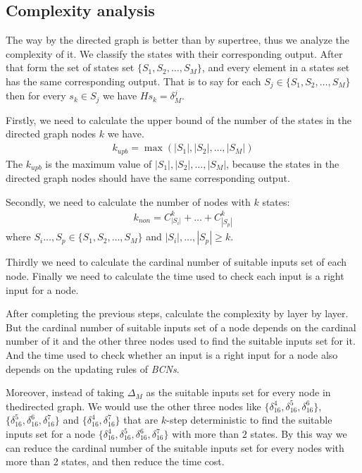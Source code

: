 \subsection{Complexity analysis}
The way by the directed graph is better than by supertree, thus we analyze the complexity of it. We classify the states with their corresponding output. After that form the set of states set $\{S_1, S_2,\ldots,S_M\}$,  and every element in a states set has the same corresponding output. That is to say for each $S_j\in\{S_1, S_2,\ldots,S_M\}$ then for every $s_k\in S_j$ we have $Hs_k=\delta_{M}^j$.

Firstly, we need to calculate the upper bound of the number of the states in the directed graph nodes $k$ we have.
\begin{equation}
\begin{split}
k_{upb}= \max(|S_1|,|S_2|,\ldots,|S_M|)
\end{split}
\end{equation}
The $ k_{upb}$ is the maximum value of $|S_1|,|S_2|,\ldots,|S_M|$, because the states in the directed graph nodes should have the same corresponding output.

Secondly, we need to calculate the number of nodes with $k$ states:
\begin{equation}
\begin{split}
k_{non}= C_{|S_i|}^k+\ldots +C_{|S_p|}^k
\end{split}
\end{equation}
where $S_i\ldots,S_p\in\{S_1, S_2,\ldots,S_M\}$ and $|S_i|,\ldots,|S_p|\ge k$.

Thirdly we need to calculate the cardinal number of suitable inputs set of each node. Finally we need to calculate the time used to check each input is a right input for a node.

After completing the previous steps, calculate the complexity by layer by layer. But the cardinal number of suitable inputs set of a node depends on the cardinal number of it and the other three nodes used to find the suitable inputs set for it. And the time used to check whether an input is a right input for a node also depends on the updating rules of {\em BCNs}.

Moreover, instead of taking $\Delta_M$ as the suitable inputs set for every node in thedirected graph. We would use the other three nodes like $\{\delta_{16}^4,\delta_{16}^5,\delta_{16}^6\}$, $\{\delta_{16}^5,\delta_{16}^6,\delta_{16}^7\}$ and $\{\delta_{16}^4,\delta_{16}^7\}$ that are $k$-step deterministic to find the suitable inputs set for a node $\{\delta_{16}^4,\delta_{16}^5,\delta_{16}^6,\delta_{16}^7\}$ with more than $2$ states. By this way we can  reduce the cardinal number of the suitable inputs set for every nodes with more than 2 states, and then reduce the time cost. 

